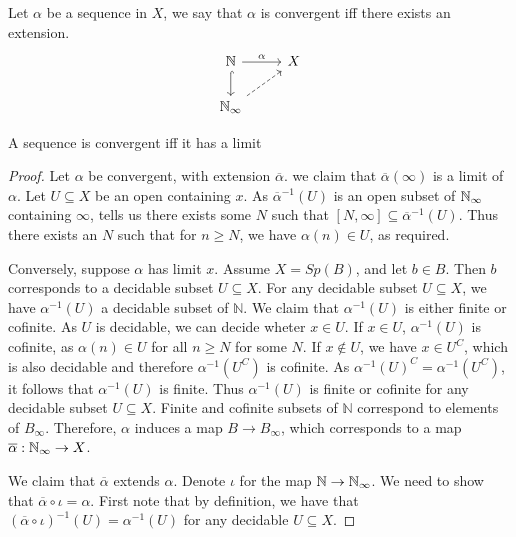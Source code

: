 \begin{definition}
  Let $\alpha$ be a sequence in $X$, we say that $\alpha$
  is convergent iff there exists an extension. 
  \begin{equation}\begin{tikzcd}
    \mathbb N \arrow[r, "\alpha"] \arrow[d,hook]  & X \\
    \Noo \arrow[ru,dashed]
  \end{tikzcd}\end{equation}  
\end{definition}  



\begin{proposition}
  A sequence is convergent iff it has a limit
\end{proposition}
\begin{proof}
  Let $\alpha$ be convergent, with extension $\overline \alpha$.
  we claim that $\overline \alpha(\infty)$ is a limit of $\alpha$.
  Let $U \subseteq X$ be an open containing $x$. 
  As $\overline\alpha^{-1}(U)$ is an open subset of $\mathbb{N}_{\infty}$ containing $\infty$,
   tells us there exists some $N$ such that $[N,\infty]\subseteq \overline \alpha^{-1}(U)$. 
  Thus there exists an $N$ such that for $n\geq N$, we have $\alpha(n) \in U$, as required. 

  Conversely, suppose $\alpha$ has limit $x$. 
  Assume $X = Sp(B)$, and let $b\in B$. Then $b$ corresponds to a decidable subset $U\subseteq X$.
  For any decidable subset $U \subseteq X$, we have 
  $\alpha^{-1}(U)$ a decidable subset of $\mathbb N$. 
  We claim that $\alpha^{-1}(U)$ is either finite or cofinite. 
  As $U$ is decidable, we can decide wheter $x\in U$. If $x\in U$, $\alpha^{-1}(U)$ is cofinite, as 
  $\alpha(n) \in U$ for all $n \geq N$ for some $N$. 
  If $x\notin U$, we have $x\in U^C$, which is also decidable and therefore $\alpha^{-1}(U^C)$ is cofinite. 
  As $\alpha^{-1}(U) ^ C = \alpha^{-1}(U^C)$, it follows that $\alpha^{-1}(U)$ is finite. 
  Thus $\alpha^{-1}(U)$ is finite or cofinite for any decidable subset $U\subseteq X$. 
  Finite and cofinite subsets of $\mathbb N$ correspond to elements of $B_\infty$. 
  Therefore, $\alpha$ induces a map $B \to B_\infty$, which corresponds to a map 
  $\overline \alpha: \mathbb{N}_{\infty} \to X$. 

  We claim that $\overline \alpha$ extends $\alpha$. 
  Denote $\iota$ for the map $\mathbb N \to \mathbb{N}_{\infty}$. 
  We need to show that $\overline \alpha \circ \iota = \alpha$. 
  First note that by definition, we have that $(\overline \alpha \circ \iota)^{-1}(U) = \alpha^{-1}(U)$ 
  for any decidable $U\subseteq X$. 





\end{proof}



